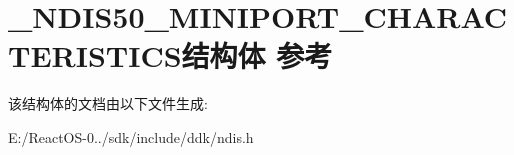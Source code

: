 \hypertarget{struct___n_d_i_s50___m_i_n_i_p_o_r_t___c_h_a_r_a_c_t_e_r_i_s_t_i_c_s}{}\section{\+\_\+\+N\+D\+I\+S50\+\_\+\+M\+I\+N\+I\+P\+O\+R\+T\+\_\+\+C\+H\+A\+R\+A\+C\+T\+E\+R\+I\+S\+T\+I\+C\+S结构体 参考}
\label{struct___n_d_i_s50___m_i_n_i_p_o_r_t___c_h_a_r_a_c_t_e_r_i_s_t_i_c_s}


该结构体的文档由以下文件生成\+:\begin{DoxyCompactItemize}
\item 
E\+:/\+React\+O\+S-\/0../sdk/include/ddk/ndis.\+h\end{DoxyCompactItemize}
